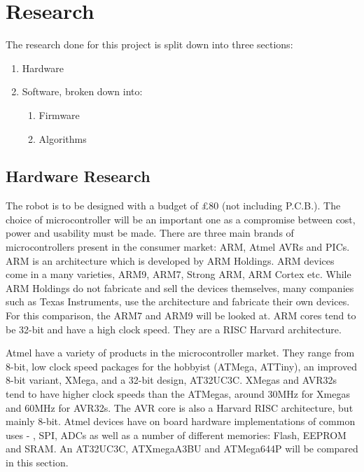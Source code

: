 \chapter{Research} \label{Chapter:Research}
The research done for this project is split down into three sections:
\begin{enumerate}
\item Hardware
\item Software, broken down into:
\begin{enumerate}
\item Firmware
\item Algorithms
\end{enumerate}
\end{enumerate}

\section{Hardware Research}
The robot is to be designed with a budget of £80 (not including P.C.B.). The choice of microcontroller will be an important one as a compromise between cost, power and usability must be made. There are three main brands of microcontrollers present in the consumer market: ARM, Atmel AVRs and PICs. 
ARM is an architecture which is developed by ARM Holdings. ARM devices come in a many varieties, ARM9, ARM7, Strong ARM, ARM Cortex etc. While ARM Holdings do not fabricate and sell the devices themselves, many companies such as Texas Instruments, use the architecture and fabricate their own devices. For this comparison, the ARM7 and ARM9 will be looked at. ARM cores tend to be 32-bit and have a high clock speed. They are a RISC Harvard architecture.

Atmel have a variety of products in the microcontroller market. They range from 8-bit, low clock speed packages for the hobbyist (ATMega, ATTiny), an improved 8-bit variant, XMega, and a 32-bit design, AT32UC3C. XMegas and AVR32s tend to have higher clock speeds than the ATMegas, around 30MHz for Xmegas and 60MHz for AVR32s. The AVR core is also a Harvard RISC architecture, but mainly 8-bit. Atmel devices have on board hardware implementations of common uses - \itc, SPI, ADCs as well as a number of different memories: Flash, EEPROM and SRAM. An AT32UC3C, ATXmegaA3BU and ATMega644P will be compared in this section. 

